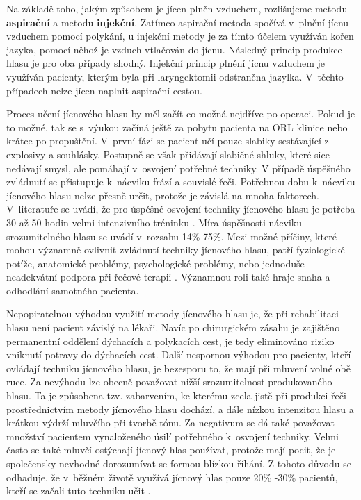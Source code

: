 Na základě toho, jakým způsobem je jícen plněn vzduchem, rozlišujeme metodu \textbf{aspirační} a metodu \textbf{injekční}. Zatímco aspirační metoda spočívá v~plnění jícnu vzduchem pomocí polykání, u injekční metody je za tímto účelem využíván kořen jazyka, pomocí něhož je vzduch vtlačován do jícnu. Následný princip produkce hlasu je pro oba případy shodný. Injekční princip plnění jícnu vzduchem je využíván pacienty, kterým byla
při laryngektomii odstraněna jazylka. V~těchto případech nelze jícen naplnit aspirační cestou.

Proces učení jícnového hlasu by měl začít co možná nejdříve po operaci. Pokud
je to možné, tak se s~výukou začíná ještě za pobytu pacienta na ORL klinice
nebo krátce po propuštění. V~první fázi se pacient učí pouze slabiky
sestávající z explosivy a souhlásky. Postupně se však přidávají slabičné
shluky, které sice nedávají smysl, ale pomáhají v~osvojení potřebné techniky.
V případě úspěšného zvládnutí se přistupuje  k~nácviku frází a souvislé řeči.
Potřebnou dobu  k~nácviku jícnového hlasu nelze přesně určit, protože je
závislá na mnoha faktorech. V~literatuře se uvádí, že pro úspěšné osvojení techniky jícnového hlasu je potřeba 30 až 50 hodin velmi intenzivního tréninku \cite{Brown2003}. Míra úspěšnosti nácviku srozumitelného hlasu se uvádí v~rozsahu 14\%-75\%. %
Mezi možné příčiny, které mohou významně ovlivnit zvládnutí techniky jícnového hlasu, patří
fyziologické potíže, anatomické problémy, psychologické problémy, nebo jednoduše
neadekvátní podpora při řečové terapii \cite{Brown2003}. Významnou roli také
hraje snaha a odhodlání samotného pacienta.

Nepopiratelnou výhodou využití metody jícnového hlasu je, že při rehabilitaci hlasu není pacient závislý na lékaři. Navíc po chirurgickém zásahu je zajištěno permanentní oddělení dýchacích a
polykacích cest, je tedy eliminováno riziko vniknutí potravy do dýchacích cest.
Další nespornou výhodou pro pacienty, kteří ovládají techniku jícnového hlasu, je bezesporu to, že mají při mluvení
volné obě ruce. Za nevýhodu lze obecně považovat nižší srozumitelnost produkovaného hlasu.
Ta je způsobena tzv.  zabarvením, ke kterému zcela jistě při produkci řeči prostřednictvím metody jícnového hlasu  dochází, a dále nízkou intenzitou hlasu a krátkou výdrží mluvčího při tvorbě tónu. Za negativum se dá také považovat množství pacientem vynaloženého úsilí potřebného  k~osvojení
techniky. Velmi často se také mluvčí ostýchají jícnový hlas používat, protože
mají pocit, že je společensky nevhodné dorozumívat se formou blízkou říhání. Z
tohoto důvodu se odhaduje, že v~běžném životě využívá jícnový hlas pouze 20\% -30\%
pacientů, kteří se začali tuto techniku učit \cite{Hradecka2007}.

